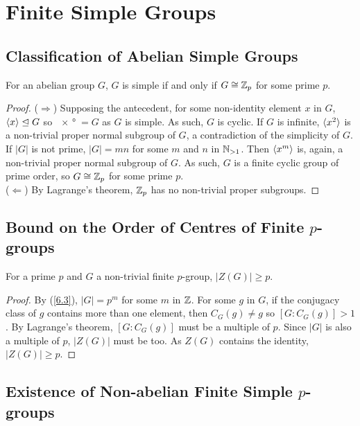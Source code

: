 \section{Finite Simple Groups}

\subsection{Classification of Abelian Simple Groups} \label{7.2}

For an abelian group $G$, $G$ is simple if and only if 
$G \cong \mathbb{Z}_p$ for some prime $p$.

\begin{proof}
    ($\Rightarrow$) Supposing the antecedent, for some
    non-identity element $x$ in $G$, ${\langle x \rangle} \trianglelefteq G$
    so $\ang{x} = G$ as $G$ is simple. As such, $G$ is cyclic.
    If $G$ is infinite, ${\langle x^2 \rangle}$ is a 
    non-trivial proper normal subgroup of
    $G$, a contradiction of the simplicity of $G$. If $|G|$
    is not prime, $|G| = mn$ for some $m$ and $n$ in $\mathbb{N}_{>1}$.
    Then ${\langle x^m \rangle}$ is, again, a non-trivial proper normal
    subgroup of $G$. As such, $G$ is a finite cyclic group
    of prime order, so $G \cong \mathbb{Z}_p$ for some prime $p$.
    \\[\baselineskip]
    ($\Leftarrow$) By Lagrange's theorem, $\mathbb{Z}_p$ has no
    non-trivial proper subgroups.
\end{proof}

\subsection{Bound on the Order of Centres of Finite $p$-groups} \label{7.3}

For a prime $p$ and $G$ a non-trivial finite $p$-group,
$|Z(G)| \geq p$.

\begin{proof}
    By (\ref{6.3}), $|G| = p^m$ for some $m$ in $\mathbb{Z}$.
    For some $g$ in $G$, if the conjugacy class of $g$ contains
    more than one element, then $C_G(g) \neq g$ so 
    $[G : C_G(g)] > 1$. By Lagrange's theorem, 
    $[G : C_G(g)]$ must be a multiple of $p$.
    Since $|G|$ is also a multiple of $p$, 
    $|Z(G)|$ must be too. As $Z(G)$ contains the
    identity, $|Z(G)| \geq p$.
\end{proof}

\subsection{Existence of Non-abelian Finite Simple $p$-groups} \label{7.4}


